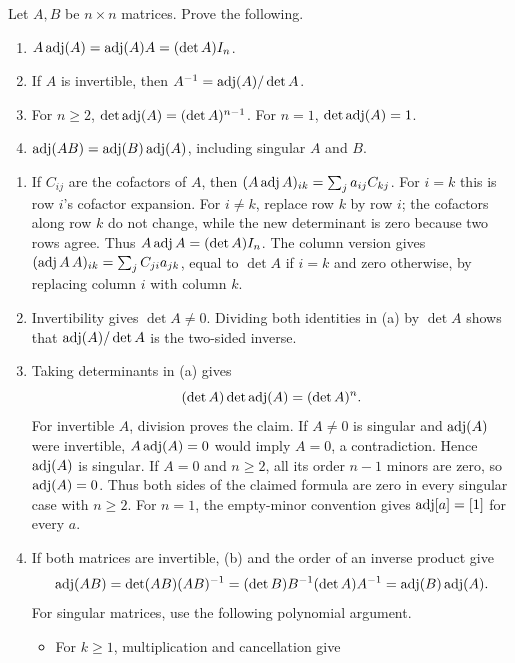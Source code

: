 \begin{problem}\label{ex:05:adjugate}
Let \(A,B\) be \(n\times n\) matrices. Prove the following.
\begin{enumerate}
\item \(A\operatorname{adj}(A)=\operatorname{adj}(A)A=(\det A)I_n\).
\item If \(A\) is invertible, then \(A^{-1}=\operatorname{adj}(A)/\det A\).
\item For \(n\geqslant2\), \(\det\operatorname{adj}(A)=(\det A)^{n-1}\).
For \(n=1\), \(\det\operatorname{adj}(A)=1\).
\item \(\operatorname{adj}(AB)=\operatorname{adj}(B)\operatorname{adj}(A)\), including singular \(A\) and \(B\).
\end{enumerate}
\end{problem}
\begin{solution}
\begin{enumerate}
\item If \(C_{ij}\) are the cofactors of \(A\), then
\((A\operatorname{adj} A)_{ik}=\sum_j a_{ij}C_{kj}\).
For \(i=k\) this is row \(i\)'s cofactor expansion. For \(i\ne k\),
replace row \(k\) by row \(i\); the cofactors along row \(k\) do not
change, while the new determinant is zero because two rows agree.
Thus \(A\operatorname{adj} A=(\det A)I_n\). The column version gives
\((\operatorname{adj} A\,A)_{ik}=\sum_j C_{ji}a_{jk}\), equal to \(\det A\) if
\(i=k\) and zero otherwise, by replacing column \(i\) with column \(k\).
\item Invertibility gives \(\det A\ne0\). Dividing both identities in (a)
by \(\det A\) shows that \(\operatorname{adj}(A)/\det A\) is the two-sided inverse.
\item Taking determinants in (a) gives
\[
(\det A)\det\operatorname{adj}(A)=(\det A)^n.
\]
For invertible \(A\), division proves the claim. If \(A\ne0\) is singular
and \(\operatorname{adj}(A)\) were invertible, \(A\operatorname{adj}(A)=0\) would imply \(A=0\),
a contradiction. Hence \(\operatorname{adj}(A)\) is singular. If \(A=0\) and
\(n\geqslant2\), all its order \(n-1\) minors are zero, so \(\operatorname{adj}(A)=0\).
Thus both sides of the claimed formula are zero in every singular case
with \(n\geqslant2\). For \(n=1\), the empty-minor convention gives
\(\operatorname{adj}[a]=[1]\) for every \(a\).
\item If both matrices are invertible, (b) and the order of an inverse product give
\[
\operatorname{adj}(AB)=\det(AB)(AB)^{-1}
=(\det B)B^{-1}(\det A)A^{-1}=\operatorname{adj}(B)\operatorname{adj}(A).
\]
For singular matrices, use the following polynomial argument.
\begin{itemize}
\item For \(k\geqslant1\), multiplication and cancellation give

\end{itemize}
\end{enumerate}
\end{solution}
